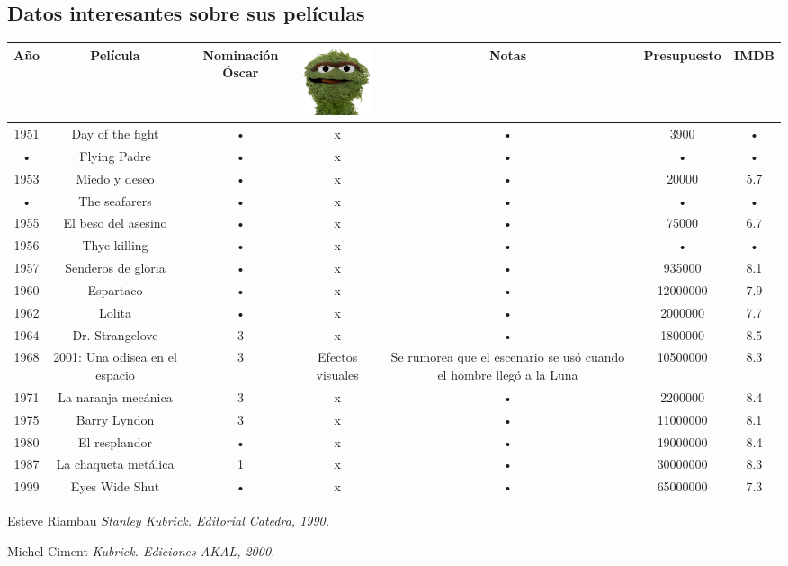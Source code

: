 \documentclass[12pt,a4paper]{article}
\begin{document}
\subsection{Datos interesantes sobre sus películas}
\begin{landscape} 
\begin{tabular}{|c|c|c|c|c|c|c|}
\hline 
Año & Película & Nominación Óscar & \includegraphics[width=22mm]{Oscar_imagen} & Notas & Presupuesto & IMDB \\ 
\hline 
1951 & Day of the fight & • & x & • & 3900 & • \\ 
\hline 
• & Flying Padre & • & x & • & • & • \\ 
\hline 
1953 & Miedo y deseo & • & x & • & 20000 & 5.7 \\ 
\hline 
• & The seafarers & • & x & • & • & • \\ 
\hline 
1955 & El beso del asesino & • & x & • & 75000 & 6.7 \\ 
\hline 
1956 & Thye killing & • & x & • & • & • \\ 
\hline 
1957 & Senderos de gloria & • & x & • & 935000 & 8.1 \\ 
\hline 
1960 & Espartaco & • & x & • & 12000000 & 7.9 \\ 
\hline 
1962 & Lolita & • & x & • & 2000000 & 7.7 \\ 
\hline 
1964 & Dr. Strangelove & 3 & x & • & 1800000 & 8.5 \\ 
\hline 
1968 & 2001: Una odisea en el espacio & 3 & Efectos visuales & Se rumorea que el escenario  se usó cuando el hombre llegó a la Luna & 10500000 & 8.3 \\ 
\hline 
1971 & La naranja mecánica & 3 & x & • & 2200000 & 8.4 \\ 
\hline 
1975 & Barry Lyndon & 3 & x & • & 11000000 & 8.1 \\ 
\hline 
1980 & El resplandor & • & x & • & 19000000 & 8.4 \\ 
\hline 
1987 & La chaqueta metálica & 1 & x & • & 30000000 & 8.3 \\ 
\hline 
1999 & Eyes Wide Shut & • & x & • & 65000000 & 7.3 \\ 
\hline 
\end{tabular} 
\end{landscape}

\begin{thebibliography}{99}
 Esteve Riambau
\emph{Stanley Kubrick. Editorial Catedra, 1990.}

 Michel Ciment
\emph{Kubrick. Ediciones AKAL, 2000.}
\end{thebibliography}
\end{document}

